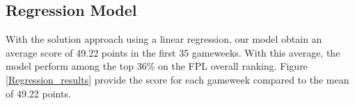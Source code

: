 \newpage
\subsection{Regression Model}
With the solution approach using a linear regression, our model obtain an average score of 49.22 points in the first 35 gameweeks. With this average, the model perform among the top 36\% on the FPL overall ranking. Figure \ref{Regression_results} provide the score for each gameweek compared to the mean of 49.22 points. 

